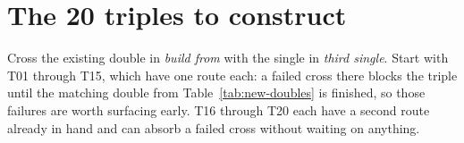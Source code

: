 
\section{The 20 triples to construct}\label{sec:triples}

Cross the existing double in \emph{build from} with the single in \emph{third
single}. Start with T01 through T15, which have one route each: a failed cross
there blocks the triple until the matching double from
Table~\ref{tab:new-doubles} is finished, so those failures are worth surfacing
early. T16 through T20 each have a second route already in hand and can absorb a
failed cross without waiting on anything.


